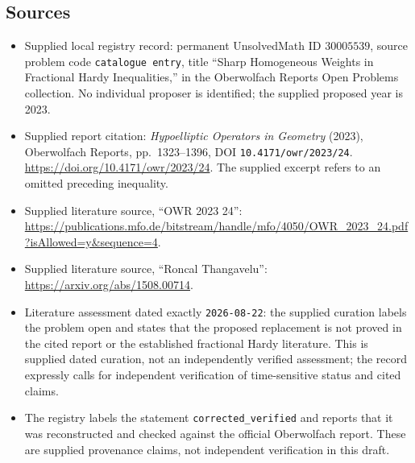\documentclass[11pt]{article}
\begin{document}
\subsection{Sources}
\begin{itemize}
\item Supplied local registry record: permanent UnsolvedMath ID \(30005539\), source problem code \texttt{catalogue entry}, title ``Sharp Homogeneous Weights in Fractional Hardy Inequalities,'' in the Oberwolfach Reports Open Problems collection. No individual proposer is identified; the supplied proposed year is 2023.
\item Supplied report citation: \emph{Hypoelliptic Operators in Geometry} (2023), Oberwolfach Reports, pp.\ 1323--1396, DOI \texttt{10.4171/owr/2023/24}. \url{https://doi.org/10.4171/owr/2023/24}. The supplied excerpt refers to an omitted preceding inequality.
\item Supplied literature source, ``OWR 2023 24'': \url{https://publications.mfo.de/bitstream/handle/mfo/4050/OWR_2023_24.pdf?isAllowed=y&sequence=4}.
\item Supplied literature source, ``Roncal Thangavelu'': \url{https://arxiv.org/abs/1508.00714}.
\item Literature assessment dated exactly \texttt{2026-08-22}: the supplied curation labels the problem open and states that the proposed replacement is not proved in the cited report or the established fractional Hardy literature. This is supplied dated curation, not an independently verified assessment; the record expressly calls for independent verification of time-sensitive status and cited claims.
\item The registry labels the statement \texttt{corrected\_verified} and reports that it was reconstructed and checked against the official Oberwolfach report. These are supplied provenance claims, not independent verification in this draft.
\end{itemize}
\end{document}
